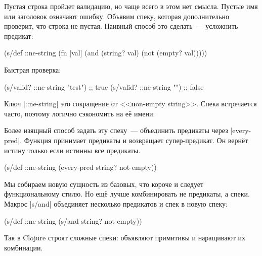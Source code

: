 Пустая строка пройдет валидацию, но чаще всего в этом нет смысла. Пустые имя или
заголовок означают ошибку. Объявим спеку, которая дополнительно проверит, что
строка не пустая. Наивный способ это сделать~--- усложнить предикат:


\begin{english}
  \begin{clojure}
(s/def ::ne-string
  (fn [val]
    (and (string? val)
         (not (empty? val)))))
  \end{clojure}
\end{english}

\noindent
Быстрая проверка:

\begin{english}
  \begin{clojure}
(s/valid? ::ne-string "test") ;; true
(s/valid? ::ne-string "")     ;; false
  \end{clojure}
\end{english}

Ключ \spverb|::ne-string| это сокращение от <<\textbf{n}on-\textbf{e}mpty
string>>. Спека встречается часто, поэтому логично сэкономить на е\"{е} имени.

Более изящный способ задать эту спеку~--- объединить предикаты через
\spverb|every-pred|. Функция принимает предикаты и возвращает супер-предикат. Он
верн\"{е}т истину только если истинны все предикаты.

\begin{english}
  \begin{clojure}
(s/def ::ne-string
  (every-pred string? not-empty))
  \end{clojure}
\end{english}


Мы собираем новую сущность из базовых, что короче и следует функциональному
стилю. Но ещ\"{е} лучше комбинировать не предикаты, а спеки. Макрос \spverb|s/and|
объединяет несколько предикатов и спек в новую спеку:

\begin{english}
  \begin{clojure}
(s/def ::ne-string
  (s/and string? not-empty))
  \end{clojure}
\end{english}

Так в Clojure строят сложные спеки: объявляют примитивы и наращивают их
комбинации.

